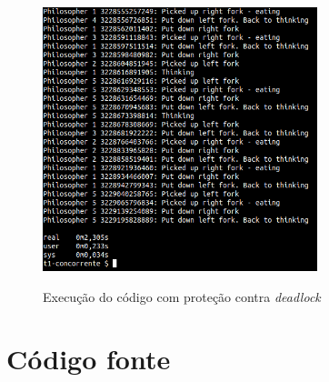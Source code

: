 \documentclass[conference]{IEEEtran}
\begin{document}
\begin{figure}[h!]
\caption{Execução do código com proteção contra \textit{deadlock}}
\centering
\includegraphics[width=8cm]{dea}
\label{fig:deadlock}
\end{figure}

\section{Código fonte}



\onecolumn






\end{document}

